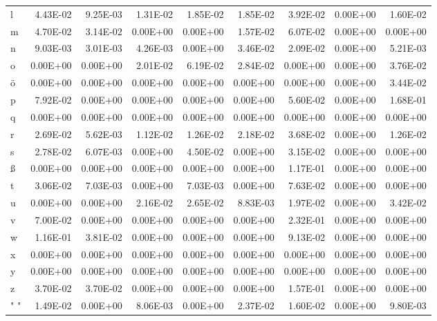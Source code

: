 \documentclass[11pt,a4paper]{CLabBookTemplate} %
\begin{document}
\begin{table}[htbp]
\begin{tabular}{lrrrrrrrr}
		l     & 4.43E-02 & 9.25E-03 & 1.31E-02 & 1.85E-02 & 1.85E-02 & 3.92E-02 & 0.00E+00 & 1.60E-02 \\
		m     & 4.70E-02 & 3.14E-02 & 0.00E+00 & 0.00E+00 & 1.57E-02 & 6.07E-02 & 0.00E+00 & 0.00E+00 \\
		n     & 9.03E-03 & 3.01E-03 & 4.26E-03 & 0.00E+00 & 3.46E-02 & 2.09E-02 & 0.00E+00 & 5.21E-03 \\
		o     & 0.00E+00 & 0.00E+00 & 2.01E-02 & 6.19E-02 & 2.84E-02 & 0.00E+00 & 0.00E+00 & 3.76E-02 \\
		ö     & 0.00E+00 & 0.00E+00 & 0.00E+00 & 0.00E+00 & 0.00E+00 & 0.00E+00 & 0.00E+00 & 3.44E-02 \\
		p     & 7.92E-02 & 0.00E+00 & 0.00E+00 & 0.00E+00 & 0.00E+00 & 5.60E-02 & 0.00E+00 & 1.68E-01 \\
		q     & 0.00E+00 & 0.00E+00 & 0.00E+00 & 0.00E+00 & 0.00E+00 & 0.00E+00 & 0.00E+00 & 0.00E+00 \\
		r     & 2.69E-02 & 5.62E-03 & 1.12E-02 & 1.26E-02 & 2.18E-02 & 3.68E-02 & 0.00E+00 & 1.26E-02 \\
		s     & 2.78E-02 & 6.07E-03 & 0.00E+00 & 4.50E-02 & 0.00E+00 & 3.15E-02 & 0.00E+00 & 0.00E+00 \\
		ß     & 0.00E+00 & 0.00E+00 & 0.00E+00 & 0.00E+00 & 0.00E+00 & 1.17E-01 & 0.00E+00 & 0.00E+00 \\
		t     & 3.06E-02 & 7.03E-03 & 0.00E+00 & 7.03E-03 & 0.00E+00 & 7.63E-02 & 0.00E+00 & 0.00E+00 \\
		u     & 0.00E+00 & 0.00E+00 & 2.16E-02 & 2.65E-02 & 8.83E-03 & 1.97E-02 & 0.00E+00 & 3.42E-02 \\
		v     & 7.00E-02 & 0.00E+00 & 0.00E+00 & 0.00E+00 & 0.00E+00 & 2.32E-01 & 0.00E+00 & 0.00E+00 \\
		w     & 1.16E-01 & 3.81E-02 & 0.00E+00 & 0.00E+00 & 0.00E+00 & 9.13E-02 & 0.00E+00 & 0.00E+00 \\
		x     & 0.00E+00 & 0.00E+00 & 0.00E+00 & 0.00E+00 & 0.00E+00 & 0.00E+00 & 0.00E+00 & 0.00E+00 \\
		y     & 0.00E+00 & 0.00E+00 & 0.00E+00 & 0.00E+00 & 0.00E+00 & 0.00E+00 & 0.00E+00 & 0.00E+00 \\
		z     & 3.70E-02 & 3.70E-02 & 0.00E+00 & 0.00E+00 & 0.00E+00 & 1.57E-01 & 0.00E+00 & 0.00E+00 \\
		" "   & 1.49E-02 & 0.00E+00 & 8.06E-03 & 0.00E+00 & 2.37E-02 & 1.60E-02 & 0.00E+00 & 9.80E-03 \\
	\end{tabular}%
	\label{tab:CI1}%
\end{table}%
\end{document}
